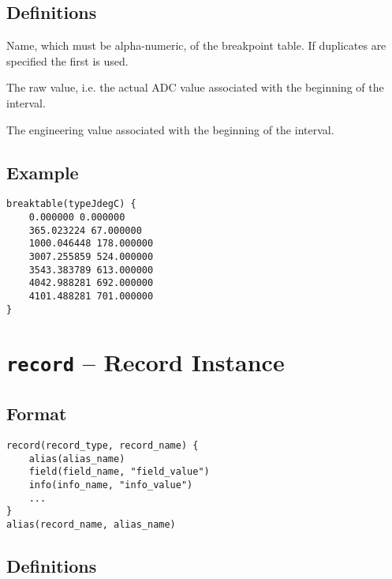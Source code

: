 \subsection{Definitions}

\begin{description}
\item [name] Name, which must be alpha-numeric, of the breakpoint table.
If duplicates are specified the first is used.

\item [raw\_value] The raw value, i.e. the actual ADC value associated with the beginning of the interval.

\item [eng\_value] The engineering value associated with the beginning of the interval.
\end{description}

\subsection{Example}

\begin{verbatim}
breaktable(typeJdegC) {
    0.000000 0.000000
    365.023224 67.000000
    1000.046448 178.000000
    3007.255859 524.000000
    3543.383789 613.000000
    4042.988281 692.000000
    4101.488281 701.000000
}
\end{verbatim}

\section{\texttt{record} -- Record Instance}

\subsection{Format}

\begin{verbatim}
record(record_type, record_name) {
    alias(alias_name)
    field(field_name, "field_value")
    info(info_name, "info_value")
    ...
}
alias(record_name, alias_name)
\end{verbatim}

\subsection{Definitions}

